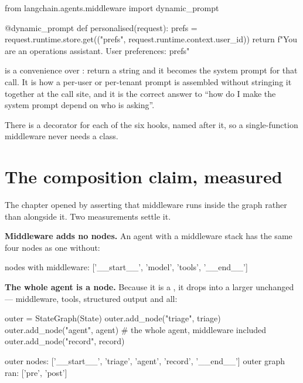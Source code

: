\begin{python}[caption={The decorator form}, label={lst:decorator}]
from langchain.agents.middleware import dynamic_prompt


@dynamic_prompt
def personalised(request):
    prefs = request.runtime.store.get(("prefs", request.runtime.context.user_id))
    return f"You are an operations assistant. User preferences: {prefs}"
\end{python}

 is a convenience over : return a
string and it becomes the system prompt for that call. It is how a per-user or
per-tenant prompt is assembled without stringing it together at the call site,
and it is the correct answer to ``how do I make the system prompt depend on who
is asking''.

There is a decorator for each of the six hooks, named after it, so a
single-function middleware never needs a class.

\section{The composition claim, measured}
\label{sec:composition}

The chapter opened by asserting that middleware runs inside the graph rather than
alongside it. Two measurements settle it.

\textbf{Middleware adds no nodes.} An agent with a middleware stack has the same
four nodes as one without:

\begin{console}
nodes with middleware: ['__start__', 'model', 'tools', '__end__']
\end{console}

\textbf{The whole agent is a node.} Because it is a
, it drops into a larger  unchanged ---
middleware, tools, structured output and all:

\begin{python}[caption={An agent as one node of a larger graph}, label={lst:agent-as-node}]
outer = StateGraph(State)
outer.add_node("triage", triage)
outer.add_node("agent", agent)        # the whole agent, middleware included
outer.add_node("record", record)
\end{python}

\begin{console}
outer nodes: ['__start__', 'triage', 'agent', 'record', '__end__']
outer graph ran: ['pre', 'post']
\end{console}

